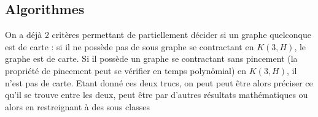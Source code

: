 \documentclass{scrartcl}
\begin{document}
\begin{flushleft}
\section{Algorithmes}

On a déjà $2$ critères permettant de partiellement décider si un graphe quelconque est de carte : si il ne possède pas
de sous graphe se contractant en $K(3, H)$, le graphe est de carte. Si il possède un graphe se contractant sans pincement
(la propriété de pincement peut se vérifier en temps polynômial) en $K(3, H)$, il n'est pas de carte.
Etant donné ces deux trucs, on peut peut être alors préciser ce qu'il se trouve entre les deux, peut être par d'autres
résultats mathématiques ou alors en restreignant à des sous classes

\end{flushleft}
\end{document}
